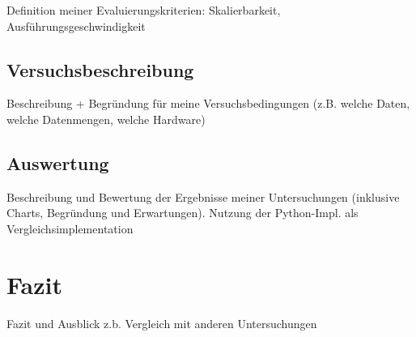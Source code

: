 Definition meiner Evaluierungskriterien:
Skalierbarkeit, Ausführungsgeschwindigkeit

\section{Versuchsbeschreibung}
Beschreibung + Begründung für meine Versuchsbedingungen (z.B. welche Daten, welche Datenmengen, welche Hardware)
\section{Auswertung}
Beschreibung und Bewertung der Ergebnisse meiner Untersuchungen (inklusive Charts, Begründung und Erwartungen). Nutzung der Python-Impl. als Vergleichsimplementation

\chapter{Fazit}
Fazit und Ausblick
z.b. Vergleich mit anderen Untersuchungen

